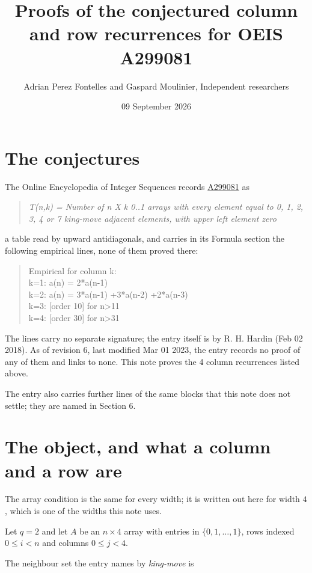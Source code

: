 \documentclass[11pt]{article}
\title{Proofs of the conjectured column and row recurrences for OEIS A299081}
\author{Adrian Perez Fontelles and Gaspard Moulinier, Independent researchers}
\date{09 September 2026}
\theoremstyle{definition}
\begin{document}
\maketitle
\section{The conjectures}

The Online Encyclopedia of Integer Sequences records \href{https://oeis.org/A299081}{A299081} as

\begin{quote}\itshape T(n,k) = Number of n X k 0..1 arrays with every element equal to 0, 1, 2, 3, 4 or 7 king-move adjacent elements, with upper left element zero\end{quote}

a table read by upward antidiagonals, and carries in its Formula section the following empirical lines, none of them proved there:

\begin{quote}\ttfamily Empirical for column k:\\
k=1: a(n) = 2*a(n-1)\\k=2: a(n) = 3*a(n-1) +3*a(n-2) +2*a(n-3)\\k=3: [order 10] for n>11\\k=4: [order 30] for n>31\end{quote}

The lines carry no separate signature; the entry itself is by R. H. Hardin (Feb 02 2018). As of revision 6, last modified Mar 01 2023, the entry records no proof of any of them and links to none. This note proves the 4 column recurrences listed above.

The entry also carries further lines of the same blocks that this note does not settle; they are named in Section 6.

\section{The object, and what a column and a row are}

The array condition is the same for every width; it is written out here for width $4$, which is one of the widths this note uses.

Let $q = 2$ and let $A$ be an $n \times 4$ array with entries in $\{0,1,\dots,1\}$, rows indexed $0 \le i < n$ and columns $0 \le j < 4$.

The neighbour set the entry names by {\itshape king-move} is
\end{document}
